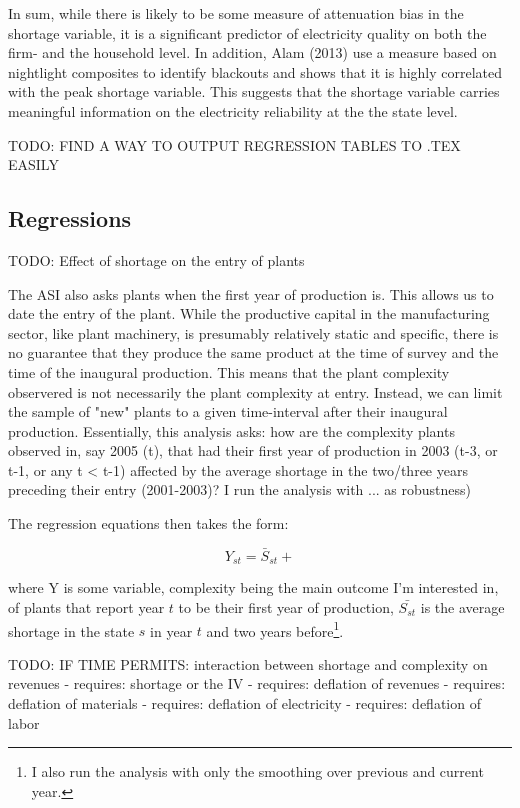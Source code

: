 \documentclass[11pt]{article}
\begin{document}
In sum, while there is likely to be some measure of attenuation bias in the shortage variable, it is a significant predictor of electricity quality on both the firm- and the household level. In addition, Alam (2013) use a measure based on nightlight composites to identify blackouts and shows that it is highly correlated with the peak shortage variable. This suggests that the shortage variable carries meaningful information on the electricity reliability at the the state level.

TODO: FIND A WAY TO OUTPUT REGRESSION TABLES TO .TEX EASILY

\subsection{Regressions}%
\label{sub:regressions}


TODO: Effect of shortage on the entry of plants

The ASI also asks plants when the first year of production is. This allows us to date the entry of the plant. While the productive capital in the manufacturing sector, like plant machinery, is presumably  relatively static and specific, there is no guarantee that they produce the same product at the time of survey and the time of the inaugural production. This means that the plant complexity observered is not necessarily the plant complexity at entry. Instead, we can limit the sample of "new" plants to a given time-interval after their inaugural production. Essentially, this analysis asks: how are the complexity plants observed in, say 2005 (t), that had their first year of production in 2003 (t-3, or t-1, or any t < t-1) affected by the average shortage in the two/three years preceding their entry (2001-2003)? I run the analysis with ... as robustness)

The regression equations then takes the form:

\[
	Y_{st} = \bar{S}_{st} + 
\]

where Y is some variable, complexity being the main outcome I'm interested in, of plants that report year \(t\) to be their first year of production, \(\bar{S_{st}}\) is the average shortage in the state \(s\) in year \(t\) and two years before\footnote{I also run the analysis with only the smoothing over previous and current year.}. 


TODO: IF TIME PERMITS: interaction between shortage and complexity on revenues - requires: shortage or the IV
 - requires: deflation of revenues
 - requires: deflation of materials
 - requires: deflation of electricity
 - requires: deflation of labor
\end{document}
